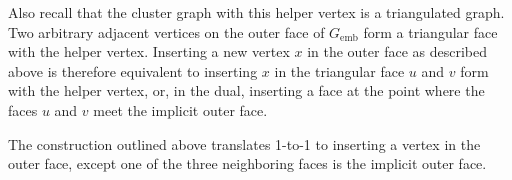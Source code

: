 Also recall that the cluster graph with this helper vertex is a triangulated graph. Two arbitrary adjacent vertices on the outer face of $G_\text{emb}$ form a triangular face with the helper vertex. Inserting a new vertex $x$ in the outer face as described above is therefore equivalent to inserting $x$ in the triangular face $u$ and $v$ form with the helper vertex, or, in the dual, inserting a face at the point where the faces $u$ and $v$ meet the implicit outer face.

The construction outlined above translates 1-to-1 to inserting a vertex in the outer face, except one of the three neighboring faces is the implicit outer face.
